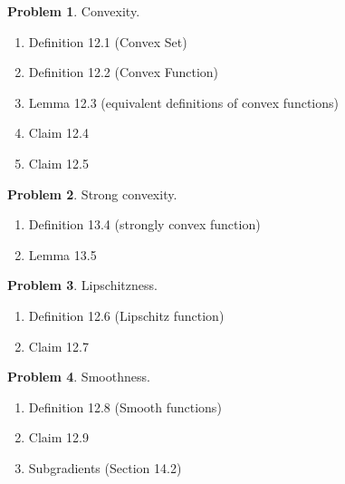 \documentclass[10pt]{article}
\theoremstyle{definition}
\newtheorem{problem}{Problem}
\begin{document}

\newpage
\begin{problem}
    Convexity.
    \begin{enumerate}
        \item Definition 12.1 (Convex Set)
            \vspace{4.5in}
        \item Definition 12.2 (Convex Function)
            \vspace{4.5in}
        \item Lemma 12.3 (equivalent definitions of convex functions)
            \vspace{4.5in}
        \item Claim 12.4
            \vspace{4.5in}
        \item Claim 12.5
            \vspace{4.5in}
    \end{enumerate}
\end{problem}

\newpage
\begin{problem}
    Strong convexity.
    \begin{enumerate}
        \item Definition 13.4 (strongly convex function)
            \vspace{4.5in}
        \item Lemma 13.5
            \vspace{4.5in}
    \end{enumerate}
\end{problem}

\newpage
\begin{problem}
    Lipschitzness.
    \begin{enumerate}
        \item Definition 12.6 (Lipschitz function)
            \vspace{4.5in}
        \item Claim 12.7
            \vspace{4.5in}
    \end{enumerate}
\end{problem}

\newpage
\begin{problem}
    Smoothness.
    \begin{enumerate}
        \item Definition 12.8 (Smooth functions)
            \vspace{4.5in}
        \item Claim 12.9
            \vspace{4.5in}
        \item Subgradients (Section 14.2)
    \end{enumerate}
\end{problem}
\end{document}
